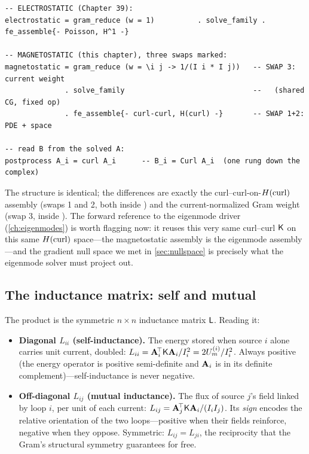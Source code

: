 \begin{lstlisting}[style=l4style]
-- ELECTROSTATIC (Chapter 39):
electrostatic = gram_reduce (w = 1)          . solve_family . fe_assemble{- Poisson, H^1 -}

-- MAGNETOSTATIC (this chapter), three swaps marked:
magnetostatic = gram_reduce (w = \i j -> 1/(I i * I j))   -- SWAP 3: current weight
              . solve_family                              --   (shared CG, fixed op)
              . fe_assemble{- curl-curl, H(curl) -}       -- SWAP 1+2: PDE + space

-- read B from the solved A:
postprocess A_i = curl A_i      -- B_i = Curl A_i  (one rung down the complex)
\end{lstlisting}
The structure is identical; the differences are exactly the curl--curl-on-$H(\mathrm{curl})$
assembly (swaps 1 and 2, both inside ) and the current-normalized
Gram weight (swap 3, inside ). The forward reference to the
eigenmode driver (\cref{ch:eigenmodes}) is worth flagging now: it reuses this very
same curl--curl $\mathsf{K}$ on this same $H(\mathrm{curl})$ space---the magnetostatic assembly
is the eigenmode assembly---and the gradient null space we met in
\cref{sec:nullspace} is precisely what the eigenmode solver must project out.

\subsection{The inductance matrix: self and mutual}

The product is the symmetric $n\times n$ inductance matrix $\mathsf{L}$. Reading it:

\begin{itemize}[nosep]
\item \textbf{Diagonal $L_{ii}$ (self-inductance).} The energy stored when source
  $i$ alone carries unit current, doubled: $L_{ii}=\mathbf{A}_i^{\!\top}\mathsf{K}\mathbf{A}_i/I_i^2
  =2U_m^{(i)}/I_i^2$. Always positive (the energy operator is positive
  semi-definite and $\mathbf{A}_i$ is in its definite complement)---self-inductance is
  never negative.
\item \textbf{Off-diagonal $L_{ij}$ (mutual inductance).} The flux of source $j$'s
  field linked by loop $i$, per unit of each current:
  $L_{ij}=\mathbf{A}_j^{\!\top}\mathsf{K}\mathbf{A}_i/(I_iI_j)$. Its \emph{sign} encodes the relative
  orientation of the two loops---positive when their fields reinforce, negative when
  they oppose. Symmetric: $L_{ij}=L_{ji}$, the reciprocity that the Gram's structural
  symmetry guarantees for free.
\end{itemize}

